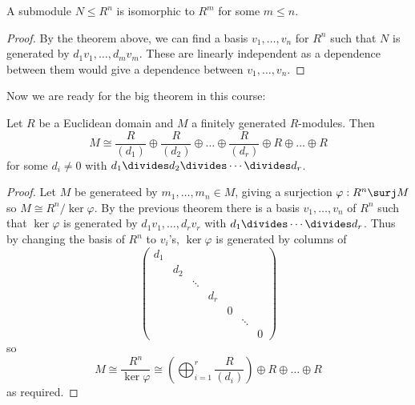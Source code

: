 \documentclass[a4paper]{article}
\begin{document}
\begin{corollary}
  A submodule \(N \leq R^n\) is isomorphic to \(R^m\) for some \(m \leq n\).
\end{corollary}

\begin{proof}
  By the theorem above, we can find a basis \(v_1, \dots, v_n\) for \(R^n\) such that \(N\) is generated by \(d_1v_1, \dots, d_mv_m\). These are linearly independent as a dependence between them would give a dependence between \(v_1, \dots, v_n\).
\end{proof}

Now we are ready for the big theorem in this course:

\begin{theorem}
  \label{thm:module over ED}
  Let \(R\) be a Euclidean domain and \(M\) a finitely generated \(R\)-modules. Then
  \[
    M \cong \frac{R}{(d_1)} \oplus \frac{R}{(d_2)} \oplus \dots \oplus \frac{R}{(d_r)} \oplus R \oplus \dots \oplus R
  \]
  for some \(d_i \neq 0\) with \(d_1 \divides d_2 \divides \cdots \divides d_r\).
\end{theorem}

\begin{proof}
  Let \(M\) be generateed by \(m_1, \dots, m_n \in M\), giving a surjection \(\varphi: R^n \surj M\) so \(M \cong R^n/\ker \varphi\). By the previous theorem there is a basis \(v_1, \dots, v_n\) of \(R^n\) such that \(\ker \varphi\) is generated by \(d_1v_1, \dots, d_rv_r\) with \(d_1 \divides \cdots \divides d_r\). Thus by changing the basis of \(R^n\) to \(v_i\)'s, \(\ker \varphi\) is generated by columns of
  \[
    \begin{pmatrix}
      d_1 \\
      & d_2 \\
      & & \ddots \\
      & & & d_r \\
      & & & & 0 \\
      & & & & & \ddots \\
      & & & & & & 0
    \end{pmatrix}
  \]
  so
  \[
    M \cong \frac{R^n}{\ker \varphi} \cong \left( \bigoplus_{i = 1}^r \frac{R}{(d_i)} \right) \oplus R \oplus \dots \oplus R
  \]
  as required.
\end{proof}
\end{document}
